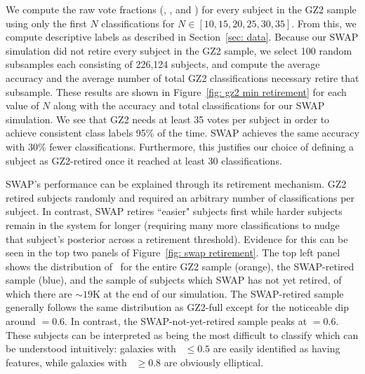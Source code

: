 We compute the raw vote fractions (\ffeat, \fsmooth, and \fstar) for every subject in the GZ2 sample using only the first $N$ classifications for $N \in [10, 15, 20, 25, 30, 35]$. From this, we compute descriptive labels as described in Section~\ref{sec: data}. Because our SWAP simulation did not retire every subject in the GZ2 sample, we select 100 random subsamples each consisting of 226,124 subjects, and compute the average accuracy and the average number of total GZ2 classifications necessary retire that subsample. These results are shown in Figure~\ref{fig: gz2 min retirement} for each value of $N$ along with the accuracy and total classifications for our SWAP simulation. We see that GZ2 needs at least 35 votes per subject in order to achieve consistent class labels 95\% of the time.  SWAP achieves the same accuracy with 30\% fewer classifications. Furthermore, this justifies our choice of defining a subject as GZ2-retired once it reached at least 30 classifications.

SWAP's performance can be explained through its retirement mechanism. GZ2 retired subjects randomly and required an arbitrary number of classifications per subject. In contrast, SWAP retires ``easier" subjects first while harder subjects remain in the system for longer (requiring many more classifications to nudge that subject's posterior across a retirement threshold).  Evidence for this can be seen in the top two panels of Figure~\ref{fig: swap retirement}. The top left panel shows the distribution of \fsmooth~for the entire GZ2 sample (orange), the SWAP-retired sample (blue), and the sample of subjects which SWAP has not yet retired, of which there are $\sim 19$K at the end of our simulation. The SWAP-retired sample generally follows the same distribution as GZ2-full except for the noticeable dip around \fsmooth$=0.6$. In contrast, the SWAP-not-yet-retired sample peaks at \fsmooth$=0.6$. These subjects can be interpreted as being the most difficult to classify which can be understood intuitively: galaxies with \fsmooth~$\le 0.5$ are easily identified as having features, while galaxies with \fsmooth~$\ge 0.8$ are obviously elliptical.

